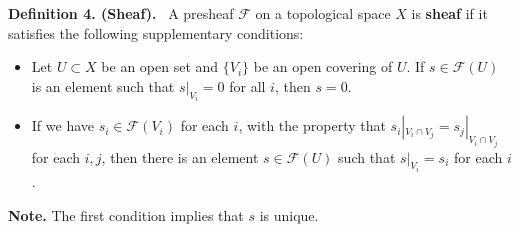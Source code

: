 \documentclass[12pt,a4paper,footinclude=true,headinclude=true]{scrbook} %
\newenvironment{definition}[2][Definition]
    { \begin{mdframed}[backgroundcolor=gray!20] \textbf{#1 #2.}\ }
    {  \end{mdframed}}
\begin{document}
\begin{definition}{4. (Sheaf)}
    A presheaf $\mathscr{F}$ on a topological space $X$ is \textbf{sheaf} if it satisfies the following supplementary conditions:
    \begin{itemize}
        \item Let $U\subset X$ be an open set and $\{V_i\}$ be an open covering of $U$. If $s\in\mathscr{F}(U)$ is an element such that $s|_{V_i}=0$ for all $i$, then $s=0$.
        \item If we have $s_i\in\mathscr{F}(V_i)$ for each $i$, with the property that $s_i|_{V_i\cap V_j}=s_j|_{V_i\cap V_j}$ for each $i,j$, then there is an element $s\in\mathscr{F}(U)$ such that $s|_{V_i}=s_i$ for each $i$. 
    \end{itemize}
    \textbf{Note.} The first condition implies that $s$ is unique.
\end{definition}
\end{document}
